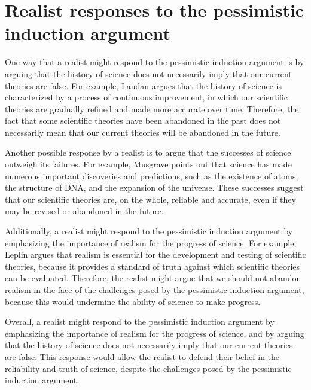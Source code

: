 \documentclass[12pt]{article}
\begin{document}
	\section*{Realist responses to the pessimistic induction argument}
	One way that a realist might respond to the pessimistic induction argument is by arguing that the history of science does not necessarily imply that our current theories are false. For example, Laudan argues that the history of science is characterized by a process of continuous improvement, in which our scientific theories are gradually refined and made more accurate over time. Therefore, the fact that some scientific theories have been abandoned in the past does not necessarily mean that our current theories will be abandoned in the future.

	Another possible response by a realist is to argue that the successes of science outweigh its failures. For example, Musgrave points out that science has made numerous important discoveries and predictions, such as the existence of atoms, the structure of DNA, and the expansion of the universe. These successes suggest that our scientific theories are, on the whole, reliable and accurate, even if they may be revised or abandoned in the future.

	Additionally, a realist might respond to the pessimistic induction argument by emphasizing the importance of realism for the progress of science. For example, Leplin argues that realism is essential for the development and testing of scientific theories, because it provides a standard of truth against which scientific theories can be evaluated. Therefore, the realist might argue that we should not abandon realism in the face of the challenges posed by the pessimistic induction argument, because this would undermine the ability of science to make progress.

	Overall, a realist might respond to the pessimistic induction argument by emphasizing the importance of realism for the progress of science, and by arguing that the history of science does not necessarily imply that our current theories are false. This response would allow the realist to defend their belief in the reliability and truth of science, despite the challenges posed by the pessimistic induction argument.
\end{document}
